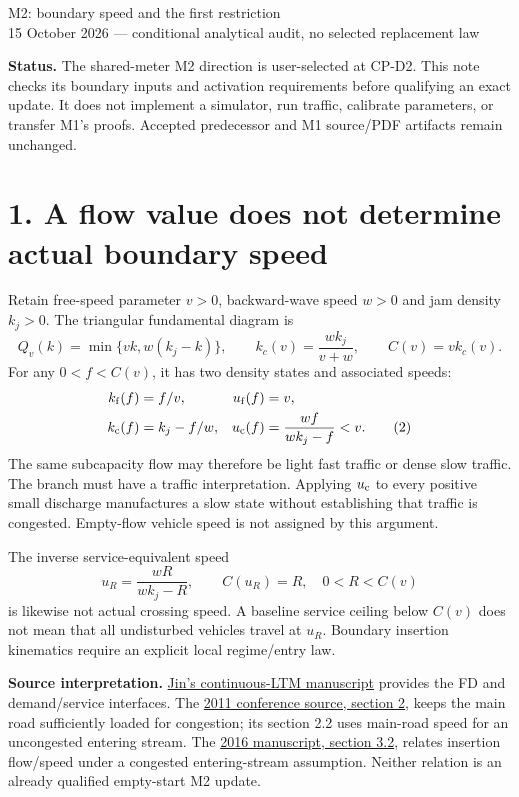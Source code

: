 \documentclass[11pt,a4paper]{article}
\begin{document}
\begin{center}
{\Large M2: boundary speed and the first restriction}\\[4pt]
15 October 2026 --- conditional analytical audit, no selected replacement law
\end{center}

\textbf{Status.} The shared-meter M2 direction is user-selected at CP-D2.
This note checks its boundary inputs and activation requirements before
qualifying an exact update. It does not implement a simulator, run traffic,
calibrate parameters, or transfer M1's proofs. Accepted predecessor and M1
source/PDF artifacts remain unchanged.

\section*{1. A flow value does not determine actual boundary speed}

Retain free-speed parameter $v>0$, backward-wave speed $w>0$ and jam
density $k_j>0$. The triangular fundamental diagram is
\begin{equation}
 Q_v(k)=\min\{vk,w(k_j-k)\},\qquad
 k_c(v)=\frac{wk_j}{v+w},\qquad C(v)=vk_c(v).
 \tag{1}
\end{equation}
For any $0<f<C(v)$, it has two density states and associated speeds:
\begin{align}
 k_{\rm f}(f)&=f/v,& u_{\rm f}(f)&=v,\nonumber\\
 k_{\rm c}(f)&=k_j-f/w,&
 u_{\rm c}(f)&=\frac{wf}{wk_j-f}<v.
 \tag{2}
\end{align}
The same subcapacity flow may therefore be light fast traffic or dense
slow traffic. The branch must have a traffic interpretation. Applying
$u_{\rm c}$ to every positive small discharge manufactures a slow state
without establishing that traffic is congested. Empty-flow vehicle speed
is not assigned by this argument.

The inverse service-equivalent speed
\begin{equation}
 u_R=\frac{wR}{wk_j-R},\qquad C(u_R)=R,
 \quad 0<R<C(v)
 \tag{3}
\end{equation}
is likewise not actual crossing speed. A baseline service ceiling below
$C(v)$ does not mean that all undisturbed vehicles travel at $u_R$.
Boundary insertion kinematics require an explicit local regime/entry law.

\textbf{Source interpretation.}
\href{https://arxiv.org/pdf/1405.7080}{Jin's continuous-LTM manuscript}
provides the FD and demand/service interfaces. The
\href{https://www.researchgate.net/publication/251530773_Capacity_Drops_at_Merges_an_endogenous_model}{2011 conference source, section 2},
keeps the main road sufficiently loaded for congestion; its section 2.2
uses main-road speed for an uncongested entering stream. The
\href{https://repository.tudelft.nl/file/File_c424c1b3-7374-436b-a6a7-abdf69063aa6}{2016 manuscript, section 3.2},
relates insertion flow/speed under a congested entering-stream assumption.
Neither relation is an already qualified empty-start M2 update.
\end{document}
